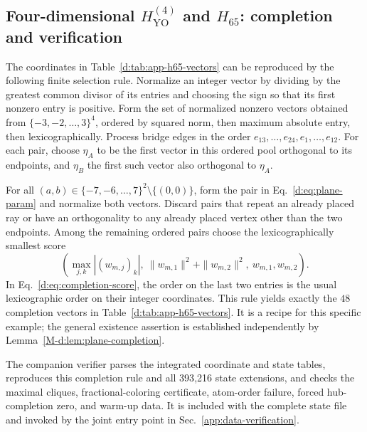 \documentclass[aps,pra,reprint,superscriptaddress,longbibliography,nofootinbib,floatfix,10pt]{revtex4-2}
\theoremstyle{definition}
\newcommand{\YO}{\mathrm{YO}}
\begin{document}
\subsection{\texorpdfstring{Four-dimensional $H_{\YO}^{(4)}$ and $H_{65}$: completion and verification}{Four-dimensional HYO(4) and H65: completion and verification}}\label{d:app:verification}

The coordinates in Table~\ref{d:tab:app-h65-vectors} can be reproduced by the following finite selection rule. Normalize an integer vector by dividing by the greatest common divisor of its entries and choosing the sign so that its first nonzero entry is positive. Form the set of normalized nonzero vectors obtained from $\{-3,-2,\ldots,3\}^4$, ordered by squared norm, then maximum absolute entry, then lexicographically. Process bridge edges in the order $e_{13},\ldots,e_{24},e_1,\ldots,e_{12}$. For each pair, choose $\eta_A$ to be the first vector in this ordered pool orthogonal to its endpoints, and $\eta_B$ the first such vector also orthogonal to $\eta_A$.

For all $(a,b)\in\{-7,-6,\ldots,7\}^2\setminus\{(0,0)\}$, form the pair in Eq.~\eqref{d:eq:plane-param} and normalize both vectors. Discard pairs that repeat an already placed ray or have an orthogonality to any already placed vertex other than the two endpoints. Among the remaining ordered pairs choose the lexicographically smallest score
\begin{equation}\label{d:eq:completion-score}
\left(\max_{j,k}|(w_{m,j})_k|,\
\|w_{m,1}\|^2+\|w_{m,2}\|^2,\ w_{m,1},w_{m,2}\right).
\end{equation}
In Eq.~\eqref{d:eq:completion-score}, the order on the last two entries is the usual lexicographic order on their integer coordinates. This rule yields exactly the $48$ completion vectors in Table~\ref{d:tab:app-h65-vectors}. It is a recipe for this specific example; the general existence assertion is established independently by Lemma~\ref{M-d:lem:plane-completion}.

The companion verifier parses the integrated coordinate and state tables,
reproduces this completion rule and all 393{,}216 state extensions, and checks
the maximal cliques, fractional-coloring certificate, atom-order failure,
forced hub-completion zero, and warm-up data. It is included with the
complete state file and invoked by the joint entry point in
Sec.~\ref{app:data-verification}.
\end{document}

